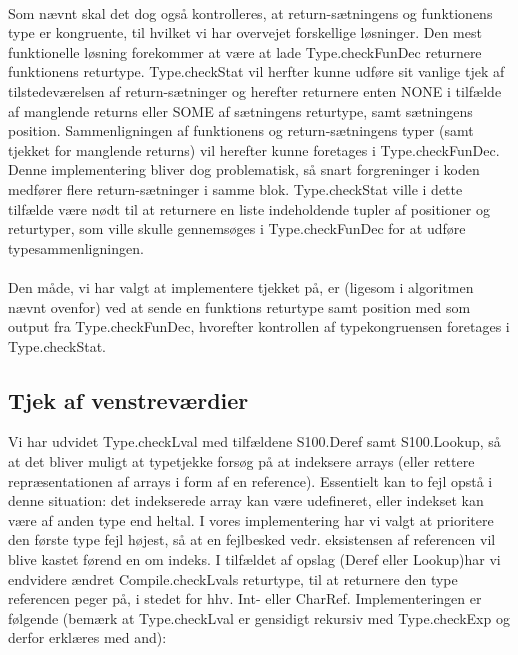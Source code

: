\documentclass[10pt,a4paper,danish]{article}
\begin{document}
\paragraph{}
Som nævnt skal det dog også kontrolleres, at return-sætningens og funktionens
type er kongruente, til hvilket vi har overvejet forskellige løsninger. Den
mest funktionelle løsning forekommer at være at lade Type.checkFunDec returnere
funktionens returtype. Type.checkStat vil herfter kunne udføre sit vanlige
tjek af tilstedeværelsen af return-sætninger og herefter returnere enten NONE
i tilfælde af manglende returns eller SOME af sætningens returtype, samt
sætningens position. 
Sammenligningen af funktionens og return-sætningens typer (samt tjekket
for manglende returns) vil herefter kunne foretages i Type.checkFunDec.
Denne implementering bliver dog problematisk, så 
snart forgreninger i koden medfører flere return-sætninger i samme blok.
Type.checkStat
ville i dette tilfælde være nødt til at returnere en liste indeholdende
tupler af positioner og returtyper, som ville skulle gennemsøges i 
Type.checkFunDec for at udføre typesammenligningen. 

\paragraph{}
Den måde, vi har valgt at implementere tjekket på, er (ligesom i algoritmen 
nævnt ovenfor) ved at sende en funktions returtype samt position med som 
output fra Type.checkFunDec, hvorefter kontrollen af typekongruensen foretages
i Type.checkStat. 


\subsection{Tjek af venstreværdier}
Vi har udvidet Type.checkLval med tilfældene S100.Deref samt
S100.Lookup, så at det bliver muligt at typetjekke forsøg på 
at indeksere arrays (eller rettere repræsentationen af arrays
i form af en reference). Essentielt kan to fejl opstå i denne 
situation: det indekserede array kan være udefineret, eller 
indekset kan være af anden type end heltal. I vores implementering
har vi valgt at prioritere den første type fejl højest, så at 
en fejlbesked vedr. eksistensen af referencen vil blive kastet
førend en om indeks. I tilfældet af opslag (Deref eller Lookup)har vi 
endvidere ændret Compile.checkLvals returtype, til at returnere 
den type referencen peger på, i stedet for hhv. Int- eller CharRef. 
Implementeringen er følgende (bemærk at Type.checkLval er gensidigt
rekursiv med Type.checkExp og derfor erklæres med and): 
\end{document}
